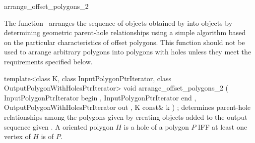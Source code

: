 

\begin{ccRefFunction}{arrange_offset_polygons_2}


\ccDefinition

The function \ccRefName\ arranges the sequence of  objects obtained by  into  objects by determining geometric parent-hole relationships using a simple algorithm based on the particular characteristics of offset polygons. This function should not be used to arrange arbitrary polygons into polygons with holes unless they meet the requirements specified below.


\ccFunction
{template<class K, class InputPolygonPtrIterator, class OutputPolygonWithHolesPtrIterator>
void arrange_offset_polygons_2 ( InputPolygonPtrIterator           begin
                               , InputPolygonPtrIterator           end
                               , OutputPolygonWithHolesPtrIterator out
                               , K const&                          k  
                               ) ;
}
{determines parent-hole relationships among the polygons given by  creating 
 objects added to the output sequence given .
A  oriented polygon $H$ is a hole of a  polygon $P$ IFF at least one vertex of $H$ is  of $P$.
}

\ccRequirements


\end{ccRefFunction}
